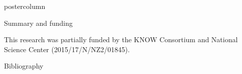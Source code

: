 \documentclass[final]{beamer}\usepackage[]{graphicx}\usepackage[]{color}
\begin{document}
\begin{frame}
\begin{columns}
\begin{column}{.48\textwidth}
\begin{beamercolorbox}[center,wd=\textwidth]{postercolumn}
\begin{minipage}[T]{.95\textwidth}
{\begin{block}{Summary and funding}
% 

\small{This research was partially funded by the KNOW Consortium and National Science Center (2015/17/N/NZ2/01845).}

\end{block}
\vfill

 \begin{block}{Bibliography}
  \tiny{
  
  
  }
  \end{block}
  \vfill  


}
\end{minipage}
\end{beamercolorbox}
\end{column}
\end{columns}  
\end{frame}
\end{document}

